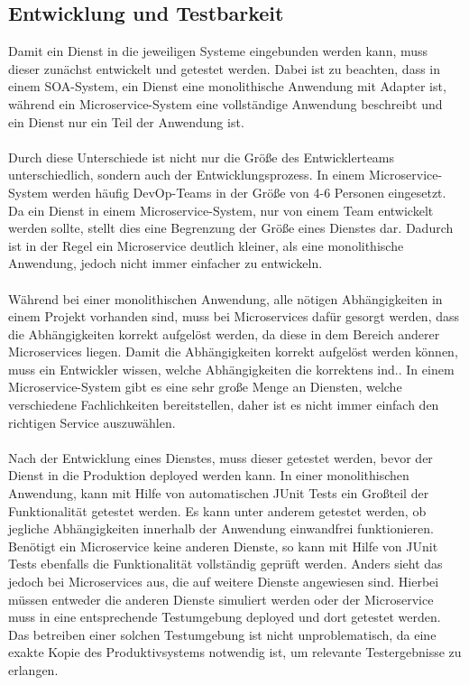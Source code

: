 \subsection{Entwicklung und Testbarkeit}
\label{subsec:EntwicklungUndTestbarkeit}
Damit ein Dienst in die jeweiligen Systeme eingebunden werden kann, muss dieser zunächst entwickelt und getestet werden. Dabei ist zu beachten, dass in einem SOA-System, ein Dienst eine monolithische Anwendung mit Adapter ist, während ein Microservice-System eine vollständige Anwendung beschreibt und ein Dienst nur ein Teil der Anwendung ist.
\\\\
Durch diese Unterschiede ist nicht nur die Größe des Entwicklerteams unterschiedlich, sondern auch der Entwicklungsprozess. In einem Microservice-System werden häufig DevOp-Teams in der Größe von 4-6 Personen eingesetzt. Da ein Dienst in einem Microservice-System, nur von einem Team entwickelt werden sollte, stellt dies eine Begrenzung der Größe eines Dienstes dar. Dadurch ist in der Regel ein Microservice deutlich kleiner, als eine monolithische Anwendung, jedoch nicht immer einfacher zu entwickeln.
\\\\
Während bei einer monolithischen Anwendung, alle nötigen Abhängigkeiten in einem Projekt vorhanden sind, muss bei Microservices dafür gesorgt werden, dass die Abhängigkeiten korrekt aufgelöst werden, da diese in dem Bereich anderer Microservices  liegen. Damit die Abhängigkeiten korrekt aufgelöst werden können, muss ein Entwickler wissen, welche Abhängigkeiten die korrektens ind.. In einem Microservice-System gibt es eine sehr große Menge an Diensten, welche verschiedene Fachlichkeiten bereitstellen, daher ist es nicht immer einfach den richtigen Service auszuwählen.
\\\\
Nach der Entwicklung eines Dienstes, muss dieser getestet werden, bevor der Dienst in die Produktion deployed werden kann. In einer monolithischen Anwendung, kann mit Hilfe von automatischen JUnit Tests ein Großteil der Funktionalität getestet werden. Es kann unter anderem getestet werden, ob jegliche Abhängigkeiten innerhalb der Anwendung einwandfrei funktionieren. Benötigt ein Microservice keine anderen Dienste, so kann mit Hilfe von JUnit Tests ebenfalls die Funktionalität vollständig geprüft werden. Anders sieht das jedoch bei Microservices aus, die auf weitere Dienste angewiesen sind. Hierbei müssen entweder die anderen Dienste simuliert werden oder der Microservice muss in eine entsprechende Testumgebung deployed und dort getestet werden. Das betreiben einer solchen Testumgebung ist nicht unproblematisch, da eine exakte Kopie des Produktivsystems notwendig ist, um relevante Testergebnisse zu erlangen.
